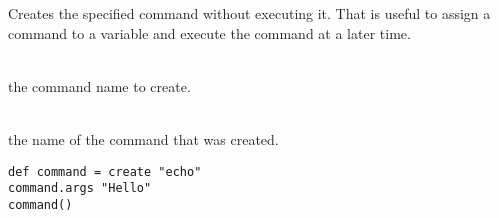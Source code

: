 %


Creates the specified command without executing it. That is useful to 
assign a command to a variable and execute the command at a later time.

\begin{asparadesc}
%
\item[\code{name}]  \hfill \\
the command name to create.
%
\item[\code{theCommandName}]  \hfill \\
the name of the command that was created.
%
\end{asparadesc}

\begin{lstlisting}[style=Groovybash, label={lst:example_create}, title={
Create command for a later execution.}]
def command = create "echo"
command.args "Hello"
command()
\end{lstlisting}

